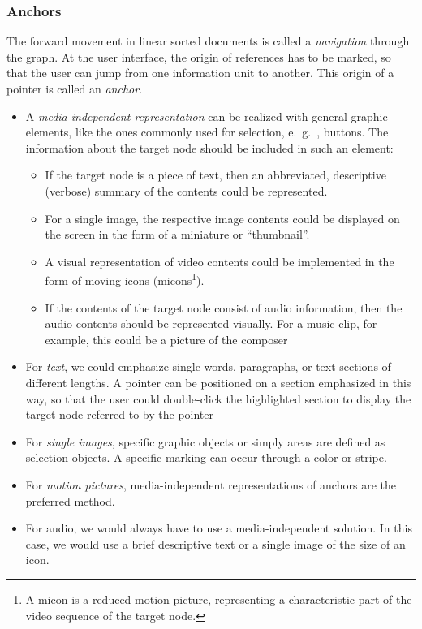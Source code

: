 \subsubsection*{Anchors}
The forward movement in linear sorted documents is called a \textit{navigation} through the graph. At the user interface, the origin of references has to be marked, so that the user can jump from one information unit to another. This origin of a pointer is called an \textit{anchor}.

\begin{multicols}{2}
	\begin{itemize}
		\item A \textit{media-independent representation} can be realized with general graphic elements, like the ones commonly used for selection, e.\ g.\ , buttons. The information about the target node should be included in such an element:
		\begin{itemize}
			\item If the target node is a piece of text, then an abbreviated, descriptive (verbose) summary of the contents could be represented. 
			\item For a single image, the respective image contents could be displayed on the screen in the form of a miniature or
			``thumbnail''. 
			\item A visual representation of video contents could be implemented in the form of moving icons (micons\footnote{ A micon is a reduced motion picture, representing a characteristic part of the video sequence of the target node.}). 
			\item If the contents of the target node consist of audio information, then the audio contents should be represented visually. For a music clip,	for example, this could be a picture of the composer
		\end{itemize}
	
	\item For \textit{text}, we could emphasize single words, paragraphs, or text sections of different lengths. A pointer can be positioned on a section emphasized in this way, so that the user could double-click the highlighted section to display the target node referred to by the pointer
	\item For \textit{single images}, specific graphic objects or simply areas are defined as selection	objects. A specific marking can occur through a color or stripe.
	\item For \textit{motion pictures}, media-independent representations of anchors are the preferred method.
	\item For audio, we would always have to use a media-independent solution. In this case, we would use a brief descriptive text or a single image of the size of an icon.
	\end{itemize}
\end{multicols}

